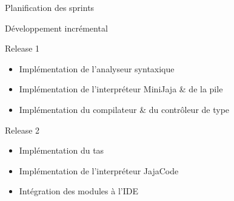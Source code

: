 \begin{frame}{Planification des sprints}
    \begin{block}{}
        \centering
        Développement incrémental
    \end{block}

    \begin{block}{Release 1}
        \begin{itemize}
            \item Implémentation de l'analyseur syntaxique
            \item Implémentation de l'interpréteur MiniJaja \& de la pile
            \item Implémentation du compilateur \& du contrôleur de type
        \end{itemize}
    \end{block}

    \begin{block}{Release 2}
        \begin{itemize}
            \item Implémentation du tas
            \item Implémentation de l'interpréteur JajaCode
            \item Intégration des modules à l'IDE
        \end{itemize}
    \end{block}
\end{frame}


